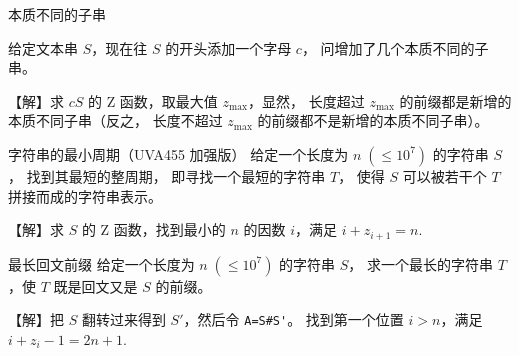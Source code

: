 \documentclass{beamer}
\begin{document}
\begin{frame}[fragile]{本质不同的子串}
    \small

    给定文本串 $S$，现在往 $S$ 的开头添加一个字母 $c$，
    问增加了几个本质不同的子串。

    \pause\vspace{1em}
    【解】求 $cS$ 的 Z 函数，取最大值 $z_\text{max}$，显然，
    长度超过 $z_\text{max}$ 的前缀都是新增的本质不同子串（反之，
    长度不超过 $z_\text{max}$ 的前缀都不是新增的本质不同子串）。
\end{frame}

\begin{frame}[fragile]{字符串的最小周期（UVA455 加强版）}
    \small
    给定一个长度为 $n\;(\leq 10^7)$ 的字符串 $S$，
    找到其最短的整周期，
    即寻找一个最短的字符串 $T$，
    使得 $S$ 可以被若干个 $T$ 拼接而成的字符串表示。

    \pause\vspace{1em}
    【解】求 $S$ 的 Z 函数，找到最小的 $n$ 的因数 $i$，满足 $i+z_{i+1}=n$.
\end{frame}

\begin{frame}[fragile]{最长回文前缀}
    \small
    给定一个长度为 $n\;(\leq 10^7)$ 的字符串 $S$，
    求一个最长的字符串 $T$，使 $T$ 既是回文又是 $S$ 的前缀。

    \pause\vspace{1em}
    【解】把 $S$ 翻转过来得到 $S'$，然后令 \verb|A=S#S'|。
    找到第一个位置 $i>n$，满足 $i+z_{i}-1=2n+1$.
\end{frame}
\end{document}
